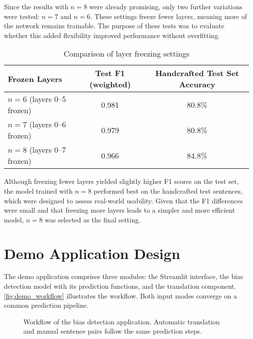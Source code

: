     Since the results with $n=8$ were already promising, only two further variations were tested: $n=7$ and $n=6$. These settings freeze fewer layers, meaning more of the network remains trainable. The purpose of these tests was to evaluate whether this added flexibility improved performance without overfitting.

    \vspace{0.8em}
    \begin{table}[ht]
        \centering
        \begin{tabularx}{\linewidth}{Xcc}
        \toprule
        \textbf{Frozen Layers} & \textbf{Test F1 (weighted)} & \textbf{Handcrafted Test Set Accuracy} \\
        \midrule
        $n=6$ (layers 0--5 frozen) & 0.981 & 80.8\% \\
        $n=7$ (layers 0--6 frozen) & 0.979 & 80.8\% \\
        $n=8$ (layers 0--7 frozen) & 0.966 & 84.8\% \\
        \bottomrule
        \end{tabularx}
        \caption{Comparison of layer freezing settings}
    \end{table}

    Although freezing fewer layers yielded slightly higher F1 scores on the test set, the model trained with $n=8$ performed best on the handcrafted test sentences, which were designed to assess real-world usability. Given that the F1 differences were small and that freezing more layers leads to a simpler and more efficient model, $n=8$ was selected as the final setting.

\section{Demo Application Design}

The demo application comprises three modules: the Streamlit interface, the bias detection model with its prediction functions, and the translation component. \autoref{fig:demo_workflow} illustrates the workflow. Both input modes converge on a common prediction pipeline.

\begin{figure}[htb]
    \centering
    \scalebox{0.8}{}
    \caption[Workflow of the bias detection application]{Workflow of the bias detection application. Automatic translation and manual sentence pairs follow the same prediction steps.}
    \label{fig:demo_workflow}
\end{figure}

